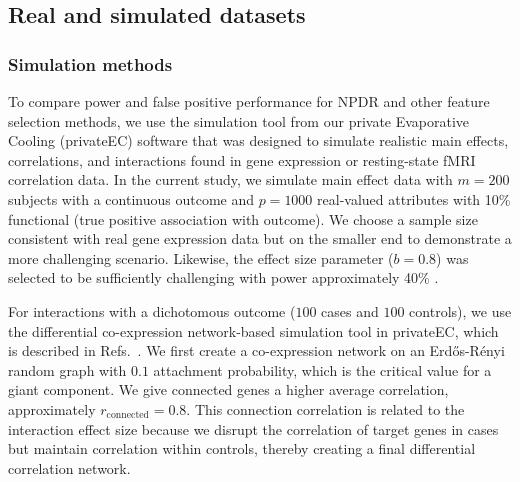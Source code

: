 \documentclass[10pt]{article}
\begin{document}
\subsection{Real and simulated datasets}
\subsubsection{Simulation methods}
To compare power and false positive performance for NPDR and other feature selection methods, we use the simulation tool from our private Evaporative Cooling (privateEC) software \cite{le17} that was designed to simulate realistic main effects, correlations, and interactions found in gene expression or resting-state fMRI correlation data.
In the current study, we simulate main effect data with $m=200$ subjects with a continuous outcome and $p=1000$ real-valued attributes with 10\% functional (true positive association with outcome).
We choose a sample size consistent with real gene expression data but on the smaller end to demonstrate a more challenging scenario.
Likewise, the effect size parameter ($b=0.8$) was selected to be sufficiently challenging with power approximately 40\% \cite{le17}. 

For interactions with a dichotomous outcome ($100$ cases and $100$ controls), we use the differential co-expression network-based simulation tool in privateEC, which is described in Refs.~\cite{le17, lareau15}. 
We first create a co-expression network on an Erd\H{o}s-R\'enyi random graph with $0.1$ attachment probability, which is the critical value for a giant component.
We give connected genes a higher average correlation, approximately $r_{\text{connected}}=0.8$. %
This connection correlation is related to the interaction effect size because we disrupt the correlation of target genes in cases but maintain correlation within controls, thereby creating a final differential correlation network.  
\end{document}
